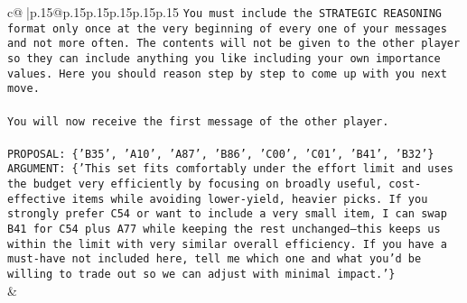 \documentclass{article}
\begin{document}
{\begin{supertabular}{c@{$\;$}|p{.15\linewidth}@{}p{.15\linewidth}p{.15\linewidth}p{.15\linewidth}p{.15\linewidth}p{.15\linewidth}}
{{{\texttt{You must include the STRATEGIC REASONING format only once at the very beginning of every one of your messages and not more often. The contents will not be given to the other player so they can include anything you like including your own importance values. Here you should reason step by step to come up with you next move.} \\
\\ 
\texttt{You will now receive the first message of the other player.} \\
\\ 
\texttt{PROPOSAL: \{'B35', 'A10', 'A87', 'B86', 'C00', 'C01', 'B41', 'B32'\}} \\
\texttt{ARGUMENT: \{'This set fits comfortably under the effort limit and uses the budget very efficiently by focusing on broadly useful, cost{-}effective items while avoiding lower{-}yield, heavier picks. If you strongly prefer C54 or want to include a very small item, I can swap B41 for C54 plus A77 while keeping the rest unchanged—this keeps us within the limit with very similar overall efficiency. If you have a must{-}have not included here, tell me which one and what you’d be willing to trade out so we can adjust with minimal impact.'\}} \\
            }
        }
    }
    & \\ \\


\end{supertabular}}
\end{document}
